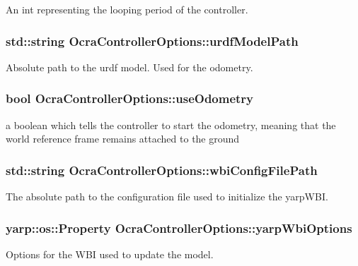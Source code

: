 \-An int representing the looping period of the controller. \hypertarget{classOcraControllerOptions_a697196e6267b2a519dd0bcc2bc03ab73}{
\subsubsection[{urdf\-Model\-Path}]{\setlength{\rightskip}{0pt plus 5cm}std\-::string {\bf \-Ocra\-Controller\-Options\-::urdf\-Model\-Path}}}\label{classOcraControllerOptions_a697196e6267b2a519dd0bcc2bc03ab73}
\-Absolute path to the urdf model. \-Used for the odometry. \hypertarget{classOcraControllerOptions_a335f09b446b6d10e2a8e6eb453391d9e}{
\subsubsection[{use\-Odometry}]{\setlength{\rightskip}{0pt plus 5cm}bool {\bf \-Ocra\-Controller\-Options\-::use\-Odometry}}}\label{classOcraControllerOptions_a335f09b446b6d10e2a8e6eb453391d9e}
a boolean which tells the controller to start the odometry, meaning that the world reference frame remains attached to the ground \hypertarget{classOcraControllerOptions_af3a98210531cf667c2838e45b470a66e}{
\subsubsection[{wbi\-Config\-File\-Path}]{\setlength{\rightskip}{0pt plus 5cm}std\-::string {\bf \-Ocra\-Controller\-Options\-::wbi\-Config\-File\-Path}}}\label{classOcraControllerOptions_af3a98210531cf667c2838e45b470a66e}
\-The absolute path to the configuration file used to initialize the yarp\-W\-B\-I. \hypertarget{classOcraControllerOptions_ac3965bdcce6cb2ce3e4a335f855acd63}{
\subsubsection[{yarp\-Wbi\-Options}]{\setlength{\rightskip}{0pt plus 5cm}yarp\-::os\-::\-Property {\bf \-Ocra\-Controller\-Options\-::yarp\-Wbi\-Options}}}\label{classOcraControllerOptions_ac3965bdcce6cb2ce3e4a335f855acd63}
\-Options for the \-W\-B\-I used to update the model. 

